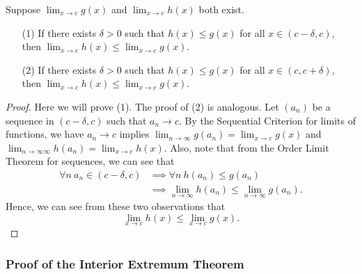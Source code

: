 \begin{lemma}
    Suppose \( \lim_{ x \to c  }  g(x)  \) and \( \lim_{ x \to c  }  h(x) \) both exist. 
    \begin{enumerate}
        \item[(1)] If there exists \( \delta > 0  \) such that \( h(x) \leq g(x) \) for all \( x \in (c -  \delta, c ) \), then \( \lim_{ x \to c  }  h(x) \leq \lim_{ x \to c  }  g(x) \).
        \item[(2)] If there exists \( \delta > 0  \) such that \( h(x) \leq g(x) \) for all \( x \in (c , c + \delta) \), then \( \lim_{ x \to c  }  h(x) \leq \lim_{ x \to c  }  g(x) \).
    \end{enumerate}
\end{lemma}
\begin{proof}
Here we will prove (1). The proof of (2) is analogous. Let \( ({a}_{n}) \) be a sequence in \( (c - \delta, c) \) such that \( {a}_{n} \to c  \). By the Sequential Criterion for limits of functions, we have \( {a}_{n} \to c  \) implies
\( \lim_{ n \to \infty  }  g({a}_{n}) = \lim_{ x \to c  }  g(x) \) and \( \lim_{ n \to \infty \infty   } h({a}_{n}) = \lim_{ x \to c  }  h(x) \). Also, note that from the Order Limit Theorem for sequences, we can see that   
\begin{align*}
    \forall n \ {a}_{n} \in (c - \delta, c ) &\implies \forall n \ h({a}_{n}) \leq g({a}_{n}) \\
                                             &\implies \lim_{ n \to \infty  }  h({a}_{n}) \leq \lim_{ n \to \infty  }  g({a}_{n}).
\end{align*}
Hence, we can see from these two observations that 
\[  \lim_{ x \to c  }  h(x) \leq \lim_{ x \to c  }  g(x). \]
\end{proof}

\subsubsection{Proof of the Interior Extremum Theorem}

